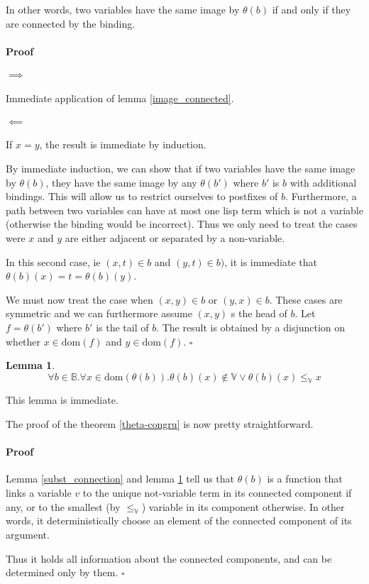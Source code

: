 \documentclass[]{article}
\newcommand{\1}{\mathbbm{1}}
\newcommand{\0}{\mathbbm{0}}
\newtheorem{lem}{Lemma}
\newenvironment{prf}{\paragraph{Proof}}{\hfill$\square$}
\newcommand{\dom}{\text{dom}}
\begin{document}
In other words, two variables have the same image by $\theta(b)$ if and only if
they are connected by the binding.

\begin{prf}
    \paragraph{$\implies$} Immediate application of lemma \ref{image_connected}.

    \paragraph{$\impliedby$} If $x=y$, the result is immediate by induction.
    
    By immediate induction, we can show that if two variables
    have the same image by $\theta(b)$, they have the same image by any $\theta(b')$
    where $b'$ is $b$ with additional bindings. This will allow us to restrict ourselves
    to postfixes of $b$. Furthermore, a path between two variables can have at most
    one lisp term which is not a variable (otherwise the binding would be incorrect).
    Thus we only need to treat the cases were $x$ and $y$ are either adjacent or
    separated by a non-variable.
    
    In this second case, ie $(x,t)\in b$ and $(y,t)\in b)$, it is immediate that
    $\theta(b)(x) = t = \theta(b)(y)$.

    We must now treat the case when $(x,y)\in b$ or $(y,x)\in b$. These cases are
    symmetric and we can furthermore assume $(x,y)$ s the head of $b$. Let
    $f = \theta(b')$ where $b'$ is the tail of $b$. The result is obtained by a
    disjunction on whether $x\in\dom(f)$ and $y\in\dom(f)$.
\end{prf}

\begin{lem}\label{ordered_theta}
    \[\forall b\in\mathbb{B}. \forall x\in\dom(\theta(b)).
    \theta(b)(x)\not\in\mathbb{V}\vee \theta(b)(x)\leq_\mathbb{V} x\]
\end{lem}

This lemma is immediate.

The proof of the theorem \ref{theta-congru} is now pretty straightforward.

\begin{prf}
    Lemma \ref{subst_connection} and lemma \ref{ordered_theta} tell us that $\theta(b)$
    is a function that links a variable $v$ to the unique not-variable term in its
    connected component if any, or to the smallest (by $\leq_\mathbb{V}$) variable in its
    component otherwise. In other words, it deterministically choose an element of the
    connected component of its argument.

    Thus it holds all information about the connected components, and can be determined
    only by them.
\end{prf}
\end{document}
